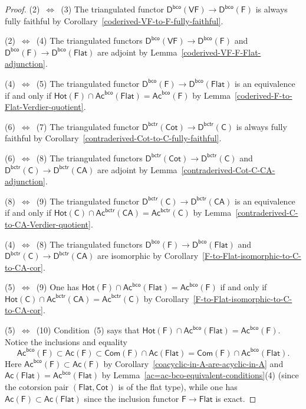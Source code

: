 \documentclass[12pt,a4paper]{amsart}
\newcommand{\+}{\nobreakdash-}
\renewcommand{\:}{\colon}
\newcommand{\rarrow}{\longrightarrow}
\newcommand{\sC}{\mathsf C}
\newcommand{\sD}{\mathsf D}
\newcommand{\sF}{\mathsf F}
\newcommand{\VF}{\mathsf{VF}}
\newcommand{\CA}{\mathsf{CA}}
\newcommand{\Flat}{\mathsf{Flat}}
\newcommand{\Cot}{\mathsf{Cot}}
\newcommand{\Hot}{\mathsf{Hot}}
\newcommand{\Com}{\mathsf{Com}}
\newcommand{\Ac}{\mathsf{Ac}}
\newcommand{\bco}{\mathsf{bco}}
\newcommand{\bctr}{\mathsf{bctr}}
\theoremstyle{plain}
\theoremstyle{definition}
\begin{document}
\begin{proof}
 (2)~$\Longleftrightarrow$~(3)
 The triangulated functor $\sD^\bco(\VF)\rarrow\sD^\bco(\sF)$ is
always fully faithful by
Corollary~\ref{coderived-VF-to-F-fully-faithful}.

 (2)~$\Longleftrightarrow$~(4)
 The triangulated functors $\sD^\bco(\VF)\rarrow\sD^\bco(\sF)$
and $\sD^\bco(\sF)\rarrow\sD^\bco(\Flat)$ are adjoint by
Lemma~\ref{coderived-VF-F-Flat-adjunction}.

 (4)~$\Longleftrightarrow$~(5)
 The triangulated functor $\sD^\bco(\sF)\rarrow\sD^\bco(\Flat)$ is
an equivalence if and only if $\Hot(\sF)\cap\Ac^\bco(\Flat)=
\Ac^\bco(\sF)$ by Lemma~\ref{coderived-F-to-Flat-Verdier-quotient}.

 (6)~$\Longleftrightarrow$~(7)
 The triangulated functor $\sD^\bctr(\Cot)\rarrow\sD^\bctr(\sC)$ is
always fully faithful by
Corollary~\ref{contraderived-Cot-to-C-fully-faithful}.

 (6)~$\Longleftrightarrow$~(8)
 The triangulated functors $\sD^\bctr(\Cot)\rarrow\sD^\bctr(\sC)$
and $\sD^\bctr(\sC)\rarrow\sD^\bctr(\CA)$ are adjoint by
Lemma~\ref{contraderived-Cot-C-CA-adjunction}.

 (8)~$\Longleftrightarrow$~(9)
 The triangulated functor $\sD^\bctr(\sC)\rarrow\sD^\bctr(\CA)$ is
an equivalence if and only if $\Hot(\sC)\cap\Ac^\bctr(\CA)=
\Ac^\bctr(\sC)$ by Lemma~\ref{contraderived-C-to-CA-Verdier-quotient}.

 (4)~$\Longleftrightarrow$~(8)
 The triangulated functors $\sD^\bco(\sF)\rarrow\sD^\bco(\Flat)$
and $\sD^\bctr(\sC)\rarrow\sD^\bctr(\CA)$ are isomorphic by
Corollary~\ref{F-to-Flat-isomorphic-to-C-to-CA-cor}.

 (5)~$\Longleftrightarrow$~(9)
 One has $\Hot(\sF)\cap\Ac^\bco(\Flat)=\Ac^\bco(\sF)$ if and only if
$\Hot(\sC)\cap\Ac^\bctr(\CA)=\Ac^\bctr(\sC)$ by
Corollary~\ref{F-to-Flat-isomorphic-to-C-to-CA-cor}.

 (5)~$\Longleftrightarrow$~(10)
 Condition~(5) says that $\Hot(\sF)\cap\Ac^\bco(\Flat)=\Ac^\bco(\sF)$.
 Notice the inclusions and equality
$$
 \Ac^\bco(\sF)\subset\Ac(\sF)\subset\Com(\sF)\cap\Ac(\Flat)=
 \Com(\sF)\cap\Ac^\bco(\Flat).
$$
 Here $\Ac^\bco(\sF)\subset\Ac(\sF)$ by
Corollary~\ref{coacyclic-in-A-are-acyclic-in-A} and
$\Ac(\Flat)=\Ac^\bco(\Flat)$ by
Lemma~\ref{ac=ac-bco-equivalent-conditions}(4)
(since the cotorsion pair $(\Flat,\Cot)$ is of the flat type),
while one has $\Ac(\sF)\subset\Ac(\Flat)$ since the inclusion
functor $\sF\rarrow\Flat$ is exact.


\end{proof}
\end{document}
